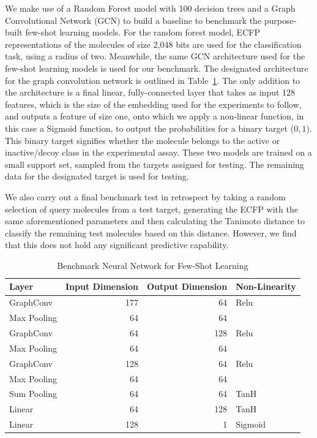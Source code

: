 We make use of a Random Forest model with 100 decision trees and a Graph Convolutional Network (GCN) to build a baseline to benchmark the purpose-built few-shot learning models. For the random forest model, ECFP representations of the molecules of size 2,048 bits are used for the classification task, using a radius of two. Meanwhile, the same GCN architecture used for the few-shot learning models is used for our benchmark. The designated architecture for the graph convolution network is outlined in Table~\ref{table:benchmarkArchi}. The only addition to the architecture is a final linear, fully-connected layer that takes as input 128 features, which is the size of the embedding used for the experiments to follow, and outputs a feature of size one, onto which we apply a non-linear function, in this case a Sigmoid function, to output the probabilities for a binary target (${0, 1}$). This binary target signifies whether the molecule belongs to the active or inactive/decoy class in the experimental assay. These two models are trained on a small support set, sampled from the targets assigned for testing. The remaining data for the designated target is used for testing.

We also carry out a final benchmark test in retrospect by taking a random selection of query molecules from a test target, generating the ECFP with the same aforementioned parameters and then calculating the Tanimoto distance to classify the remaining test molecules based on this distance. However, we find that this does not hold any significant predictive capability. 

\begin{table}
	\centering
	\begin{tabular}{@{}lrrl@{}}
	\hline
	\textbf{Layer} & \textbf{Input Dimension} & \textbf{Output Dimension} & \textbf{Non-Linearity} \\
	\hline
	GraphConv & 177 & 64 & Relu \\
	Max Pooling & 64 & 64 &  \\
	GraphConv & 64 & 128 & Relu \\
	Max Pooling & 64 & 64 &  \\
	GraphConv & 128 & 64 & Relu \\
	Max Pooling & 64 & 64 &  \\
	Sum Pooling & 64 & 64 & TanH \\
	Linear & 64 & 128 & TanH \\
	Linear & 128 & 1 & Sigmoid \\
	\hline
	\end{tabular}
	\caption{Benchmark Neural Network for Few-Shot Learning}
	\label{table:benchmarkArchi}
	\end{table}

